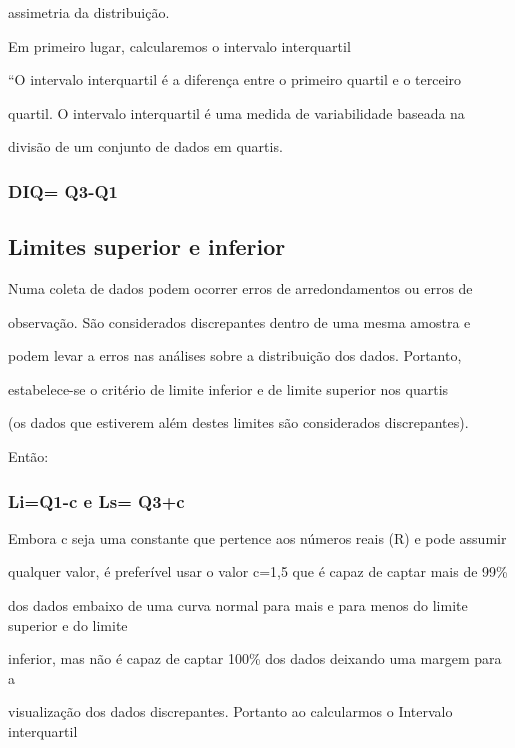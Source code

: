 \documentclass[]{book}
\begin{document}
assimetria da distribuição.

Em primeiro lugar, calcularemos o intervalo interquartil

``O intervalo interquartil é a diferença entre o primeiro quartil e o terceiro

quartil. O intervalo interquartil é uma medida de variabilidade baseada na

divisão de um conjunto de dados em quartis.

\hypertarget{diq-q3-q1}{%
\subsubsection{DIQ= Q3-Q1}\label{diq-q3-q1}}

\hypertarget{limites-superior-e-inferior}{%
\subsection{Limites superior e inferior}\label{limites-superior-e-inferior}}

Numa coleta de dados podem ocorrer erros de arredondamentos ou erros de

observação. São considerados discrepantes dentro de uma mesma amostra e

podem levar a erros nas análises sobre a distribuição dos dados. Portanto,

estabelece-se o critério de limite inferior e de limite superior nos quartis

(os dados que estiverem além destes limites são considerados discrepantes).

Então:

\hypertarget{liq1-c-e-ls-q3c}{%
\subsubsection{Li=Q1-c e Ls= Q3+c}\label{liq1-c-e-ls-q3c}}

Embora c seja uma constante que pertence aos números reais (R) e pode assumir

qualquer valor, é preferível usar o valor c=1,5 que é capaz de captar mais de 99\%

dos dados embaixo de uma curva normal para mais e para menos do limite superior e do limite

inferior, mas não é capaz de captar 100\% dos dados deixando uma margem para a

visualização dos dados discrepantes. Portanto ao calcularmos o Intervalo interquartil
\end{document}
